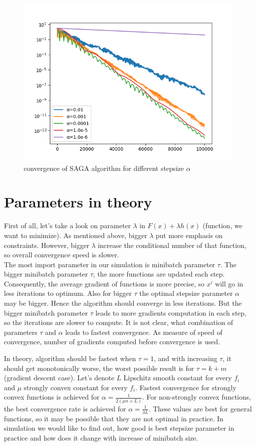 \documentclass[11pt]{book}
\begin{document}
\begin{figure}[H]
	\centering
	\includegraphics[width=0.7\linewidth]{saga_convergence.png}
	\caption{convergence of SAGA algorithm for different stepsize $\alpha$}
	\label{fig:saga}
\end{figure}

\section{Parameters in theory}

First of all, let's take a look on parameter $\lambda$ in $F(x)+\lambda h(x)$ (function, we want to minimize). As mentioned above, bigger $\lambda$ put more emphasis on constraints. However, bigger $\lambda$ increase the conditional number of that function, so overall convergence speed is slower.\\

The most import parameter in our simulation is minibatch parameter $\tau$. The bigger minibatch parameter $\tau$, the more functions are updated each step. Consequently, the average gradient of functions is more precise, so $x^i$ will go in less iterations to optimum. Also for bigger $\tau$ the optimal stepsize parameter $\alpha$ may be bigger. Hence the algorithm should converge in less iterations. But the bigger minibatch parameter $\tau$ leads to more gradients computation in each step, so the iterations are slower to compute.
It is not clear, what combination of parameters $\tau$ and $\alpha$ leads to fastest convergence. As measure of speed of convergence, number of gradients computed before convergence is used.

In theory, algorithm should be fastest when $\tau=1$, and with increasing $\tau$, it should get monotonically worse, the worst possible result is for $\tau = k+m$ (gradient descent case). Let's denote $L$ Lipschitz smooth constant for every $f_i$ and $\mu$ strongly convex constant for every $f_i$. Fastest convergence for strongly convex functions is achieved for $\alpha = \frac{1}{2(\mu n + L)}$. For non-strongly convex functions, the best convergence rate is achieved for $\alpha = \frac{1}{3L}$. These values are best for general functions, so it may be possible that they are not optimal in practice. In simulation we would like to find out, how good is best stepsize parameter in practice and how does it change with increase of minibatch size.
\end{document}
